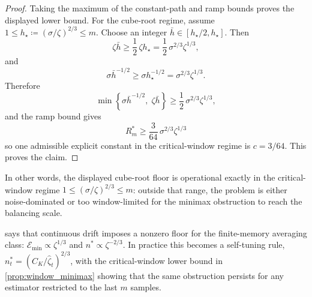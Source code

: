 \begin{proof}
Taking the maximum of the constant-path and ramp bounds proves the displayed
lower bound. For the cube-root regime, assume
$1 \leq h_\star \coloneqq (\sigma/\zeta)^{2/3} \leq m$. Choose an integer
$\bar h \in [h_\star/2, h_\star]$. Then
\[
  \zeta \bar h \geq \frac{1}{2}\,\zeta h_\star
  = \frac{1}{2}\,\sigma^{2/3}\zeta^{1/3},
\]
and
\[
  \sigma \bar h^{-1/2}
  \geq \sigma h_\star^{-1/2}
  = \sigma^{2/3}\zeta^{1/3}.
\]
Therefore
\[
  \min\!\left\{\sigma \bar h^{-1/2},\; \zeta \bar h\right\}
  \geq \frac{1}{2}\,\sigma^{2/3}\zeta^{1/3},
\]
and the ramp bound gives
\[
  R_m^* \geq \frac{3}{64}\,\sigma^{2/3}\zeta^{1/3}
\]
so one admissible explicit constant in the critical-window regime is
$c = 3/64$. This proves the claim.
\end{proof}

In other words, the displayed cube-root floor is operational exactly in the
critical-window regime $1 \leq (\sigma/\zeta)^{2/3} \leq m$: outside that range,
the problem is either noise-dominated or too window-limited for the minimax
obstruction to reach the balancing scale.

\begin{remark}\label{rem:cdfloor}
 says that continuous drift imposes a nonzero floor
for the finite-memory averaging class: $\mathcal{E}_{\min} \propto \zeta^{1/3}$
and $n^* \propto \zeta^{-2/3}$. In practice this becomes a self-tuning rule,
$n_t^* = (C_K/\hat\zeta_t)^{2/3}$, with the critical-window lower bound in
\cref{prop:window_minimax} showing that the same obstruction persists for any
estimator restricted to the last $m$ samples.
\end{remark}
